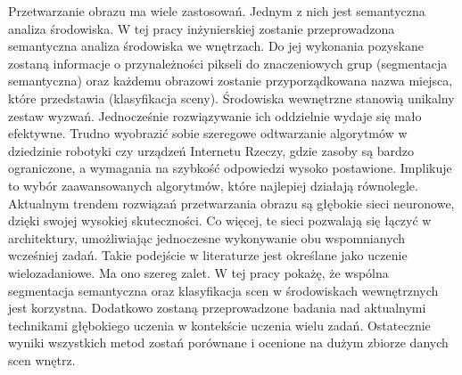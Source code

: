 Przetwarzanie obrazu ma wiele zastosowań. Jednym z nich jest semantyczna analiza środowiska. W tej pracy inżynierskiej zostanie przeprowadzona semantyczna analiza środowiska we wnętrzach. Do jej wykonania pozyskane zostaną informacje o przynależności pikseli do znaczeniowych grup (segmentacja semantyczna) oraz każdemu obrazowi zostanie przyporządkowana nazwa miejsca, które przedstawia (klasyfikacja sceny). Środowiska wewnętrzne stanowią unikalny zestaw wyzwań. Jednocześnie rozwiązywanie ich oddzielnie wydaje się mało efektywne. Trudno wyobrazić sobie szeregowe odtwarzanie algorytmów w dziedzinie robotyki czy urządzeń Internetu Rzeczy, gdzie zasoby są bardzo ograniczone, a wymagania na szybkość odpowiedzi wysoko postawione. Implikuje to wybór zaawansowanych algorytmów, które najlepiej działają równolegle. Aktualnym trendem rozwiązań przetwarzania obrazu są głębokie sieci neuronowe, dzięki swojej wysokiej skuteczności. Co więcej, te sieci pozwalają się łączyć w architektury, umożliwiając jednoczesne wykonywanie obu wspomnianych wcześniej zadań. Takie podejście w literaturze jest określane jako uczenie wielozadaniowe. Ma ono szereg zalet. W tej pracy pokażę, że wspólna segmentacja semantyczna oraz klasyfikacja scen w środowiskach wewnętrznych jest korzystna. Dodatkowo zostaną przeprowadzone badania nad aktualnymi technikami głębokiego uczenia w kontekście uczenia wielu zadań. Ostatecznie wyniki wszystkich metod zostań porównane i ocenione na dużym zbiorze danych scen wnętrz.



